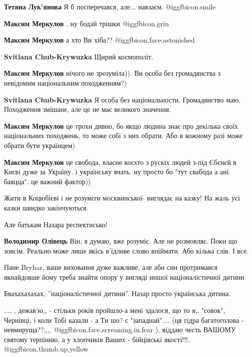 \begin{itemize}
\begin{itemize}
\textbf{Тетяна Лук'янова} Я б посперечався, але... навзаєм.  @igg{fbicon.smile} 

\textbf{Максим Меркулов} , ну бодай трішки  @igg{fbicon.grin} 

\textbf{Максим Меркулов} а хто Ви хіба??  @igg{fbicon.face.astonished} 

\textbf{Svitlana Chub-Krywuzka} Щирий космополіт.

\textbf{Максим Меркулов} нічого не зрозуміла)). Ви особа без громадянства з невідомим національним походженням?)

\textbf{Svitlana Chub-Krywuzka} Я особа без національности. Громадянство маю. Походження змішане, але це не має великого значення.

\textbf{Максим Меркулов} це трохи дивно, бо якщо людина знає про декілька своїх національних походжень, то може собі з них обрати. Або в кожному разі може обрати бути українцем)

\textbf{Максим Меркулов} це свобода. власне коєхто з рускіх людей з-під Єбєнєй в Києві дуже за Україну. і українську вчать. ну просто бо "тут свабода а ані баяцца". це важний фактор))
\end{itemize} %


Жити в Коцюбієві і не розуміти москвинської- виглядає на казку! На жаль усі казки швидко закінчуються.

Але батькам Назара респектисько!

\begin{itemize} %
\textbf{Володимир Олівець} Він, я думаю, вже розуміє. Але не розмовляє. Поки що зовсім. Реально може лише якісь в'їдливе слово впіймати. Або кілька слів. І все.

Пане Bryhar, ваше виховання дуже важливе, але аби син протримався якнайдовше йому треба знайти опору у вигляді иншої націоналістичної дитини

Бвахахахахах, ''націоналістичної дитини''.
Назар просто українська дитина.
\end{itemize} %


.... , дежав'ю,, - стільки років пройшло-а мені здалося, що то я,. "совок",
Чернівці, і коли Тобі казали - а Ти шо? с "западнай".... (ця гідра багатоголова
- невмируща??,,,,  @igg{fbicon.face.screaming.in.fear} ), віддаю честь ВАШОМУ святому терпінню, а у хлопчиків
Ваших - бійцівські якості!!!.  @igg{fbicon.thumb.up.yellow} 🔱


\end{itemize}
